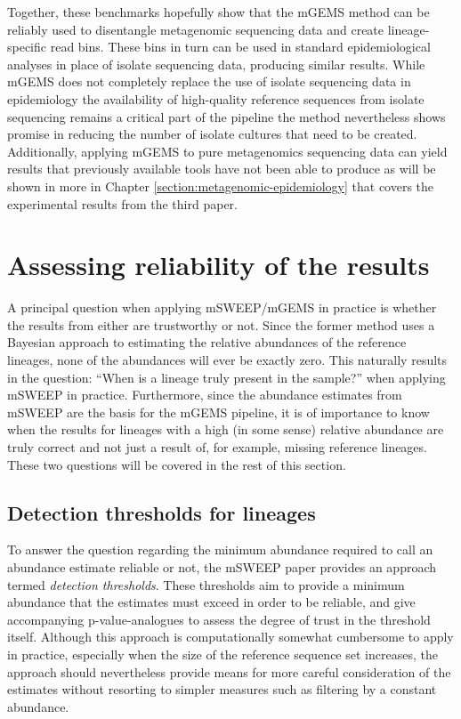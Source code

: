 \documentclass[officiallayout]{tktla}
\begin{document}
Together, these benchmarks hopefully show that the mGEMS method can be
reliably used to disentangle metagenomic sequencing data and create
lineage-specific read bins. These bins in turn can be used in standard
epidemiological analyses in place of isolate sequencing data,
producing similar results. While mGEMS does not completely replace the
use of isolate sequencing data in epidemiology \textemdash{ } the
availability of high-quality reference sequences from isolate
sequencing remains a critical part of the pipeline \textemdash{ } the
method nevertheless shows promise in reducing the number of isolate
cultures that need to be created. Additionally, applying mGEMS to pure
metagenomics sequencing data can yield results that previously
available tools have not been able to produce as will be shown in more
in Chapter \ref{section:metagenomic-epidemiology} that covers the
experimental results from the third paper.

\section{Assessing reliability of the results}

A principal question when applying mSWEEP/mGEMS in practice is whether
the results from either are trustworthy or not. Since the former
method uses a Bayesian approach to estimating the relative abundances
of the reference lineages, none of the abundances will ever be exactly
zero. This naturally results in the question: ``When is a lineage
truly present in the sample?'' when applying mSWEEP in
practice. Furthermore, since the abundance estimates from mSWEEP are
the basis for the mGEMS pipeline, it is of importance to know when the
results for lineages with a high (in some sense) relative abundance
are truly correct and not just a result of, for example, missing
reference lineages. These two questions will be covered in the rest of
this section.

\subsection{Detection thresholds for lineages}
To answer the question regarding the minimum abundance required to
call an abundance estimate reliable or not, the mSWEEP paper provides
an approach termed \textit{detection thresholds}. These thresholds aim
to provide a minimum abundance that the estimates must exceed in order
to be reliable, and give accompanying p-value-analogues to assess the
degree of trust in the threshold itself. Although this approach is
computationally somewhat cumbersome to apply in practice, especially
when the size of the reference sequence set increases, the approach
should nevertheless provide means for more careful consideration of
the estimates without resorting to simpler measures such as filtering
by a constant abundance.
\end{document}
